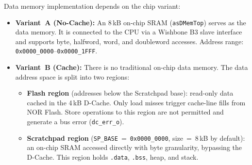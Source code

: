 Data memory implementation depends on the chip variant:

\begin{itemize}
  \item \textbf{Variant~A (No-Cache):}
    An 8\,kB on-chip SRAM (\texttt{asDMemTop}) serves as the data memory.
    It is connected to the CPU via a Wishbone B3 slave interface and
    supports byte, halfword, word, and doubleword accesses.
    Address range: \texttt{0x0000\_0000}--\texttt{0x0000\_1FFF}.

  \item \textbf{Variant~B (Cache):}
    There is no traditional on-chip data memory.
    The data address space is split into two regions:
    \begin{itemize}
      \item \textbf{Flash region} (addresses below the Scratchpad base):
        read-only data cached in the 4\,kB D-Cache.
        Only load misses trigger cache-line fills from NOR Flash.
        Store operations to this region are not permitted and generate a
        bus error (\texttt{dc\_err\_o}).
      \item \textbf{Scratchpad region}
        (\texttt{SP\_BASE}~=~\texttt{0x0000\_0000},
        size~=~8\,kB by default):
        an on-chip SRAM accessed directly with byte granularity,
        bypassing the D-Cache.
        This region holds \texttt{.data}, \texttt{.bss}, heap, and stack.
    \end{itemize}
\end{itemize}
